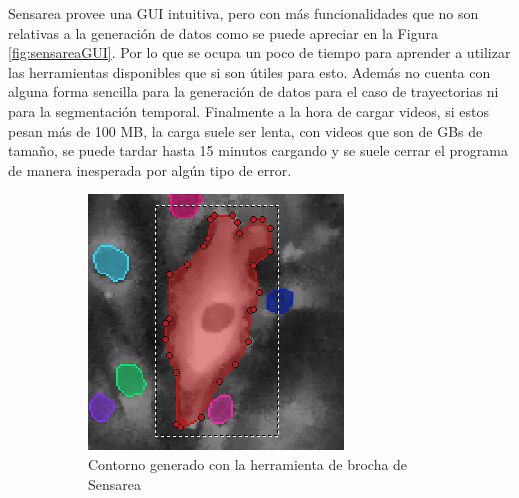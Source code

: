 Sensarea provee una GUI intuitiva, pero con más funcionalidades que no son relativas a la generación de datos como se puede apreciar en la Figura \ref{fig:sensareaGUI}. Por lo que se ocupa un poco de tiempo para aprender a utilizar las herramientas disponibles que si son útiles para esto. Además no cuenta con alguna forma sencilla para la generación de datos para el caso de trayectorias ni para la segmentación temporal. Finalmente a la hora de cargar videos, si estos pesan más de 100 MB, la carga suele ser lenta, con videos que son de GBs de tamaño, se puede tardar hasta 15 minutos cargando y se suele cerrar el programa de manera inesperada por algún tipo de error.

\begin{figure}
	\centering
	\begin{subfigure}[b]{0.3\textwidth}
		\includegraphics[width=\textwidth]{images/sens1}
		\caption{Contorno generado con la herramienta de brocha de Sensarea}
		\label{fig:sens1}
	\end{subfigure}\qquad%
	~ %
	\begin{subfigure}[b]{0.3\textwidth}

\end{subfigure}
\end{figure}
